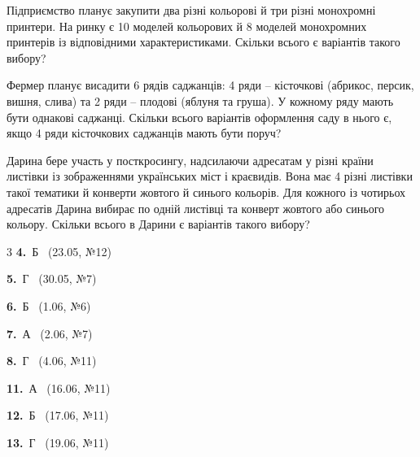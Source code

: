\documentclass[12pt]{article}
\begin{document}
\begin{samepage}
\noindent\zadnum Підприємство планує закупити два різні кольорові й три різні монохромні принтери. На ринку є 10 моделей кольорових й 8 моделей монохромних принтерів із відповідними характеристиками. Скільки всього є варіантів такого вибору? 

\nmtnobreak
\nopagebreak\nbvspace{0.5cm}
\nmtAnswerBox
\par{}
\end{samepage}

\begin{samepage}
\noindent\zadnum Фермер планує висадити 6 рядів саджанців: 4 ряди – кісточкові (абрикос, персик, вишня, слива) та 2 ряди – плодові (яблуня та груша). У кожному ряду мають бути однакові саджанці. Скільки всього варіантів оформлення саду в нього є, якщо 4 ряди кісточкових саджанців мають бути поруч? 

\nmtnobreak
\nopagebreak\nbvspace{0.5cm}
\nmtAnswerBox
\par{}
\end{samepage}

\begin{samepage}
\noindent\zadnum Дарина бере участь у посткросингу, надсилаючи адресатам у різні країни листівки із зображеннями українських міст і краєвидів. Вона має 4 різні листівки такої тематики й конверти жовтого й синього кольорів. Для кожного із чотирьох адресатів Дарина вибирає по одній листівці та конверт жовтого або синього кольору. Скільки всього в Дарини є варіантів такого вибору? 

\nmtnobreak
\nopagebreak\nbvspace{0.5cm}
\nmtAnswerBox
\par{}
\end{samepage}

\ifshowsolutions
{}
\begin{multicols}{3}\noindent
\noindent\textbf{4.}~Б \ {\scriptsize\color{gray}(23.05, №12)}\par
\noindent\textbf{5.}~Г \ {\scriptsize\color{gray}(30.05, №7)}\par
\noindent\textbf{6.}~Б \ {\scriptsize\color{gray}(1.06, №6)}\par
\noindent\textbf{7.}~А \ {\scriptsize\color{gray}(2.06, №7)}\par
\noindent\textbf{8.}~Г \ {\scriptsize\color{gray}(4.06, №11)}\par
\noindent\textbf{11.}~А \ {\scriptsize\color{gray}(16.06, №11)}\par
\noindent\textbf{12.}~Б \ {\scriptsize\color{gray}(17.06, №11)}\par
\noindent\textbf{13.}~Г \ {\scriptsize\color{gray}(19.06, №11)}\par
\end{multicols}
\fi

\endgroup
\end{document}
